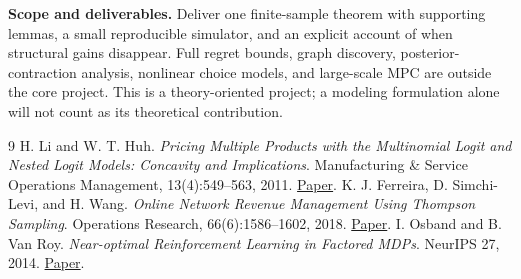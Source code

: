 \documentclass[10pt]{article}
\begin{document}
\textbf{Scope and deliverables.} Deliver one finite-sample theorem with supporting lemmas, a small reproducible simulator, and an explicit account of when structural gains disappear. Full regret bounds, graph discovery, posterior-contraction analysis, nonlinear choice models, and large-scale MPC are outside the core project. This is a theory-oriented project; a modeling formulation alone will not count as its theoretical contribution.

\begingroup
\small
\begin{thebibliography}{9}
\setlength{\itemsep}{1pt}
 H. Li and W. T. Huh. \emph{Pricing Multiple Products with the Multinomial Logit and Nested Logit Models: Concavity and Implications}. Manufacturing \& Service Operations Management, 13(4):549--563, 2011. \href{https://doi.org/10.1287/msom.1110.0344}{Paper}.
 K. J. Ferreira, D. Simchi-Levi, and H. Wang. \emph{Online Network Revenue Management Using Thompson Sampling}. Operations Research, 66(6):1586--1602, 2018. \href{https://doi.org/10.1287/opre.2018.1755}{Paper}.
 I. Osband and B. Van Roy. \emph{Near-optimal Reinforcement Learning in Factored MDPs}. NeurIPS 27, 2014. \href{https://arxiv.org/abs/1403.3741}{Paper}.
\end{thebibliography}
\endgroup
\end{document}
